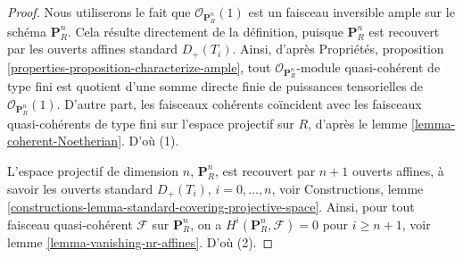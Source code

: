 \begin{proof}
Nous utiliserons le fait que $\mathcal{O}_{\mathbf{P}^n_R}(1)$ est un faisceau inversible
ample sur
le schéma $\mathbf{P}^n_R$. Cela résulte directement de la définition,
puisque $\mathbf{P}^n_R$ est recouvert par les ouverts affines standard $D_{+}(T_i)$.
Ainsi, d'après
Propriétés, proposition \ref{properties-proposition-characterize-ample},
tout $\mathcal{O}_{\mathbf{P}^n_R}$-module
quasi-cohérent de type fini est quotient d'une somme directe finie de puissances tensorielles de
$\mathcal{O}_{\mathbf{P}^n_R}(1)$. D'autre part, les faisceaux cohérents
coïncident avec les faisceaux quasi-cohérents de type fini sur l'espace
projectif sur $R$, d'après le lemme \ref{lemma-coherent-Noetherian}. D'où (1).

\medskip\noindent
L'espace projectif de dimension $n$, $\mathbf{P}^n_R$, est recouvert par $n + 1$ ouverts
affines, à savoir les ouverts standard $D_{+}(T_i)$, $i = 0, \ldots, n$, voir Constructions,
lemme \ref{constructions-lemma-standard-covering-projective-space}.
Ainsi, pour tout faisceau
quasi-cohérent $\mathcal{F}$ sur $\mathbf{P}^n_R$,
on a $H^i(\mathbf{P}^n_R, \mathcal{F}) = 0$ pour $i \geq n + 1$,
voir lemme \ref{lemma-vanishing-nr-affines}. D'où (2).


\end{proof}
